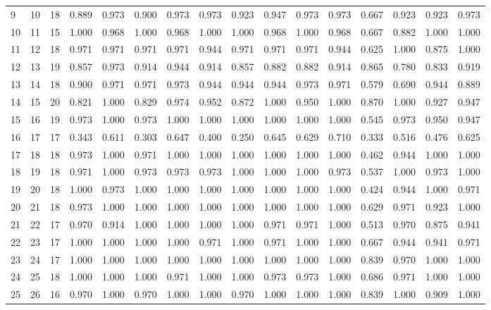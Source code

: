 \begin{longtable}{lrllllllllllllll}
9 & 10 & 18 & 0.889 & 0.973 & 0.900 & 0.973 & 0.973 & 0.923 & 0.947 & 0.973 & 0.973 & 0.667 & 0.923 & 0.923 & 0.973 \\
10 & 11 & 15 & 1.000 & 0.968 & 1.000 & 0.968 & 1.000 & 1.000 & 0.968 & 1.000 & 0.968 & 0.667 & 0.882 & 1.000 & 1.000 \\
11 & 12 & 18 & 0.971 & 0.971 & 0.971 & 0.971 & 0.944 & 0.971 & 0.971 & 0.971 & 0.944 & 0.625 & 1.000 & 0.875 & 1.000 \\
12 & 13 & 19 & 0.857 & 0.973 & 0.914 & 0.944 & 0.914 & 0.857 & 0.882 & 0.882 & 0.914 & 0.865 & 0.780 & 0.833 & 0.919 \\
13 & 14 & 18 & 0.900 & 0.971 & 0.971 & 0.973 & 0.944 & 0.944 & 0.944 & 0.973 & 0.971 & 0.579 & 0.690 & 0.944 & 0.889 \\
14 & 15 & 20 & 0.821 & 1.000 & 0.829 & 0.974 & 0.952 & 0.872 & 1.000 & 0.950 & 1.000 & 0.870 & 1.000 & 0.927 & 0.947 \\
15 & 16 & 19 & 0.973 & 1.000 & 0.973 & 1.000 & 1.000 & 1.000 & 1.000 & 1.000 & 1.000 & 0.545 & 0.973 & 0.950 & 0.947 \\
16 & 17 & 17 & 0.343 & 0.611 & 0.303 & 0.647 & 0.400 & 0.250 & 0.645 & 0.629 & 0.710 & 0.333 & 0.516 & 0.476 & 0.625 \\
17 & 18 & 18 & 0.973 & 1.000 & 0.971 & 1.000 & 1.000 & 1.000 & 1.000 & 1.000 & 1.000 & 0.462 & 0.944 & 1.000 & 1.000 \\
18 & 19 & 18 & 0.971 & 1.000 & 0.973 & 0.973 & 0.973 & 1.000 & 1.000 & 1.000 & 0.973 & 0.537 & 1.000 & 0.973 & 1.000 \\
19 & 20 & 18 & 1.000 & 0.973 & 1.000 & 1.000 & 1.000 & 1.000 & 1.000 & 1.000 & 1.000 & 0.424 & 0.944 & 1.000 & 0.971 \\
20 & 21 & 18 & 0.973 & 1.000 & 1.000 & 1.000 & 1.000 & 1.000 & 1.000 & 1.000 & 1.000 & 0.629 & 0.971 & 0.923 & 1.000 \\
21 & 22 & 17 & 0.970 & 0.914 & 1.000 & 1.000 & 1.000 & 1.000 & 0.971 & 0.971 & 1.000 & 0.513 & 0.970 & 0.875 & 0.941 \\
22 & 23 & 17 & 1.000 & 1.000 & 1.000 & 1.000 & 0.971 & 1.000 & 0.971 & 1.000 & 1.000 & 0.667 & 0.944 & 0.941 & 0.971 \\
23 & 24 & 17 & 1.000 & 1.000 & 1.000 & 1.000 & 1.000 & 1.000 & 1.000 & 1.000 & 1.000 & 0.839 & 0.970 & 1.000 & 1.000 \\
24 & 25 & 18 & 1.000 & 1.000 & 1.000 & 0.971 & 1.000 & 1.000 & 0.973 & 0.973 & 1.000 & 0.686 & 0.971 & 1.000 & 1.000 \\
25 & 26 & 16 & 0.970 & 1.000 & 0.970 & 1.000 & 1.000 & 0.970 & 1.000 & 1.000 & 1.000 & 0.839 & 1.000 & 0.909 & 1.000 \\

\end{longtable}
